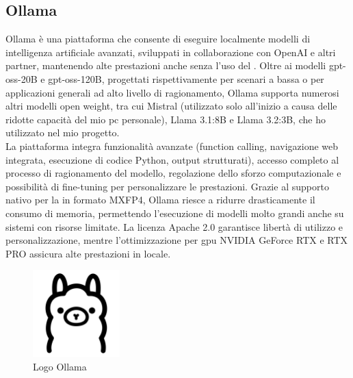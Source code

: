 \subsection{Ollama}
\noindent Ollama è una piattaforma che consente di eseguire localmente modelli di intelligenza artificiale avanzati, sviluppati in collaborazione con OpenAI e altri partner, mantenendo alte prestazioni anche senza l’uso del . 
Oltre ai modelli gpt-oss-20B e gpt-oss-120B, progettati rispettivamente per scenari a bassa  o per applicazioni generali ad alto livello di ragionamento, Ollama supporta numerosi altri modelli open weight, tra cui Mistral (utilizzato solo all’inizio a causa delle ridotte capacità del mio pc personale), Llama 3.1:8B e Llama 3.2:3B, che ho utilizzato nel mio progetto.\\ 
La piattaforma integra funzionalità avanzate (function calling, navigazione web integrata, esecuzione di codice Python, output strutturati), accesso completo al processo di ragionamento del modello, regolazione dello sforzo computazionale e possibilità di fine-tuning per personalizzare le prestazioni. 
Grazie al supporto nativo per la  in formato MXFP4, Ollama riesce a ridurre drasticamente il consumo di memoria, permettendo l’esecuzione di modelli molto grandi anche su sistemi con risorse limitate. 
La licenza Apache 2.0 garantisce libertà di utilizzo e personalizzazione, mentre l’ottimizzazione per \acrshort{gpu} NVIDIA GeForce RTX e RTX PRO assicura alte prestazioni in locale.
\begin{figure}[H]
    \centering
    \includegraphics[width=0.3\textwidth]{img/ollama.png}
    \caption[Logo Ollama]{Logo Ollama}
\end{figure}


